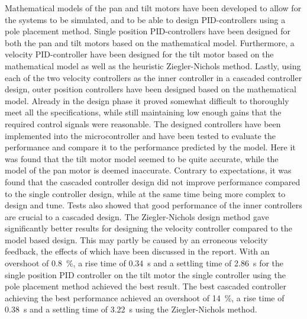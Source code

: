 \documentclass[../../main.tex]{subfiles}
\begin{document}
%

Mathematical models of the pan and tilt motors have been developed to allow for the systems to be simulated, and to be able to design PID-controllers using a pole placement method.
Single position PID-controllers have been designed for both the pan and tilt motors based on the mathematical model. Furthermore, a velocity PID-controller have been designed for the tilt motor based on the mathematical model as well as the heuristic Ziegler-Nichols method. Lastly, using each of the two velocity controllers as the inner controller in a cascaded controller design, outer position controllers have been designed based on the mathematical model. Already in the design phase it proved somewhat difficult to thoroughly meet all the specifications, while still maintaining low enough gains that the required control signals were reasonable.
The designed controllers have been implemented into the microcontroller and have been tested to evaluate the performance and compare it to the performance predicted by the model.
Here it was found that the tilt motor model seemed to be quite accurate, while the model of the pan motor is deemed inaccurate.
Contrary to expectations, it was found that the cascaded controller design did not improve performance compared to the single controller design, while at the same time being more complex to design and tune.
Tests also showed that good performance of the inner controllers are crucial to a cascaded design. The Ziegler-Nichols design method gave significantly better results for designing the velocity controller compared to the model based design. This may partly be caused by an erroneous velocity feedback, the effects of which have been discussed in the report.
With an overshoot of \SI{0,8}{\percent}, a rise time of \SI{0,34}{\second} and a settling time of \SI{2,86}{\second} for the single position PID controller on the tilt motor the single controller using the pole placement method achieved the best result. The best cascaded controller achieving the best performance achieved an overshoot of \SI{14}{\percent}, a rise time of \SI{0,38}{\second} and a settling time of \SI{3,22}{\second} using the Ziegler-Nichols method. 

\end{document}
